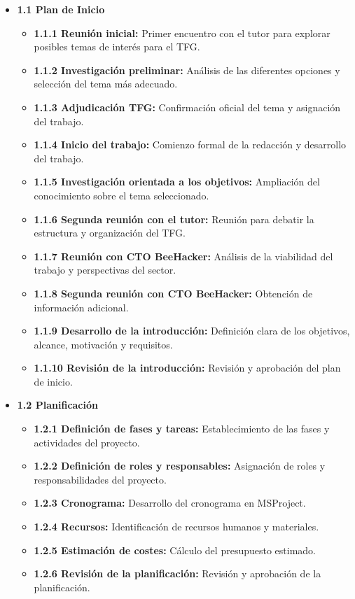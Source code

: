 \documentclass[a4paper, 10pt]{article}
\begin{document}
\begin{itemize}
    \item \textbf{1.1 Plan de Inicio}
    \begin{itemize}
        \item \textbf{1.1.1 Reunión inicial:} Primer encuentro con el tutor para explorar posibles temas de interés para el TFG.
        \item \textbf{1.1.2 Investigación preliminar:} Análisis de las diferentes opciones y selección del tema más adecuado.
        \item \textbf{1.1.3 Adjudicación TFG:} Confirmación oficial del tema y asignación del trabajo.
        \item \textbf{1.1.4 Inicio del trabajo:} Comienzo formal de la redacción y desarrollo del trabajo.
        \item \textbf{1.1.5 Investigación orientada a los objetivos:} Ampliación del conocimiento sobre el tema seleccionado.
        \item \textbf{1.1.6 Segunda reunión con el tutor:} Reunión para debatir la estructura y organización del TFG.
        \item \textbf{1.1.7 Reunión con CTO BeeHacker:} Análisis de la viabilidad del trabajo y perspectivas del sector.
        \item \textbf{1.1.8 Segunda reunión con CTO BeeHacker:} Obtención de información adicional.
        \item \textbf{1.1.9 Desarrollo de la introducción:} Definición clara de los objetivos, alcance, motivación y requisitos.
        \item \textbf{1.1.10 Revisión de la introducción:} Revisión y aprobación del plan de inicio.
    \end{itemize}

    \item \textbf{1.2 Planificación}
    \begin{itemize}
        \item \textbf{1.2.1 Definición de fases y tareas:} Establecimiento de las fases y actividades del proyecto.
        \item \textbf{1.2.2 Definición de roles y responsables:} Asignación de roles y responsabilidades del proyecto.
        \item \textbf{1.2.3 Cronograma:} Desarrollo del cronograma en MSProject.
        \item \textbf{1.2.4 Recursos:} Identificación de recursos humanos y materiales.
        \item \textbf{1.2.5 Estimación de costes:} Cálculo del presupuesto estimado.
        \item \textbf{1.2.6 Revisión de la planificación:} Revisión y aprobación de la planificación.
    \end{itemize}


\end{itemize}
\end{document}

